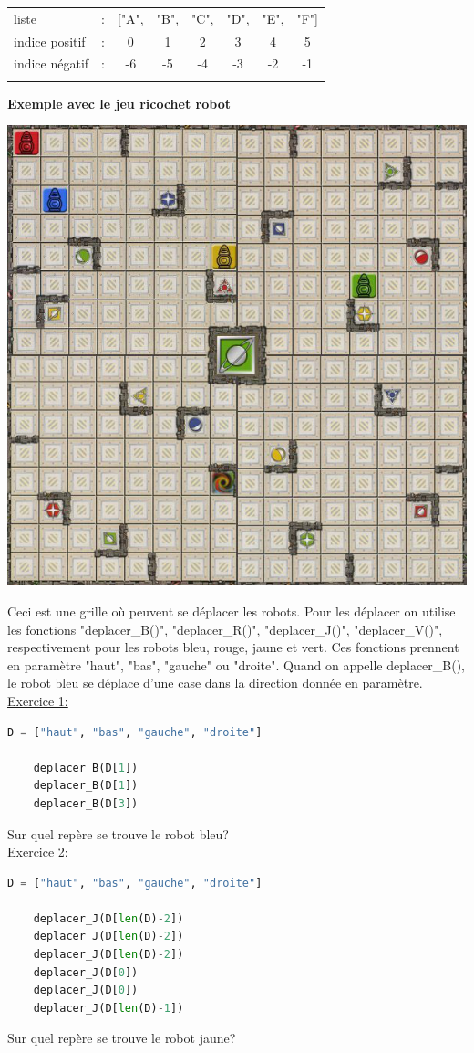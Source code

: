 \documentclass{report}
\begin{document}
    \begin{tabular}{l c c c c c c c}
        liste & : &["A", & "B", & "C", & "D", & "E", &"F"]\\
        indice positif & : & 0 & 1 & 2 & 3 & 4 & 5\\
        indice négatif & : & -6 & -5 & -4 & -3 & -2 & -1\\
        \\
    \end{tabular}

\newpage
\textbf{Exemple avec le jeu ricochet robot}
\begin{center}
    \includegraphics[width=0.7\linewidth]{ricochet-robots-plateau}
\end{center}
Ceci est une grille où peuvent se déplacer les robots. Pour les déplacer on utilise les fonctions "deplacer\_B()", "deplacer\_R()", "deplacer\_J()", "deplacer\_V()", respectivement pour les robots bleu, rouge, jaune et vert.
Ces fonctions prennent en paramètre "haut", "bas", "gauche" ou "droite". Quand on appelle deplacer\_B(), le robot bleu se déplace d'une case dans la direction donnée en paramètre.\\


\underline{Exercice 1:}
\begin{lstlisting}[language=Python]
    D = ["haut", "bas", "gauche", "droite"]

    deplacer_B(D[1])
    deplacer_B(D[1])
    deplacer_B(D[3])
\end{lstlisting}
Sur quel repère se trouve le robot bleu?\\

\underline{Exercice 2:}
\begin{lstlisting}[language=Python]
    D = ["haut", "bas", "gauche", "droite"]

    deplacer_J(D[len(D)-2])
    deplacer_J(D[len(D)-2])
    deplacer_J(D[len(D)-2])
    deplacer_J(D[0])
    deplacer_J(D[0])
    deplacer_J(D[len(D)-1])
\end{lstlisting}
Sur quel repère se trouve le robot jaune?
\end{document}
